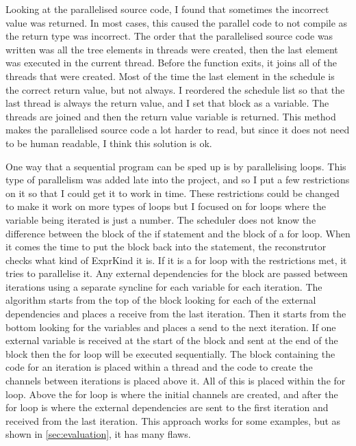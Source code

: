  Looking at the parallelised source code, I found that sometimes the incorrect value was returned. In most cases, this caused the parallel code to not compile as the return type was incorrect. The order that the parallelised source code was written was all the tree elements in threads were created, then the last element was executed in the current thread. Before the function exits, it joins all of the threads that were created. Most of the time the last element in the schedule is the correct return value, but not always. I reordered the schedule list so that the last thread is always the return value, and I set that block as a variable. The threads are joined and then the return value variable is returned. This method makes the parallelised source code a lot harder to read, but since it does not need to be human readable, I think this solution is ok.

One way that a sequential program can be sped up is by parallelising loops. This type of parallelism was added late into the project, and so I put a few restrictions on it so that I could get it to work in time. These restrictions could be changed to make it work on more types of loops but I focused on for loops where the variable being iterated is just a number. The scheduler does not know the difference between the block of the if statement and the block of a for loop. When it comes the time to put the block back into the statement, the reconstrutor checks what kind of ExprKind it is. If it is a for loop with the restrictions met, it tries to parallelise it. Any external dependencies for the block are passed between iterations using a separate syncline for each variable for each iteration. The algorithm starts from the top of the block looking for each of the external dependencies and places a receive from the last iteration. Then it starts from the bottom looking for the variables and places a send to the next iteration. If one external variable is received at the start of the block and sent at the end of the block then the for loop will be executed sequentially. The block containing the code for an iteration is placed within a thread and the code to create the channels between iterations is placed above it. All of this is placed within the for loop. Above the for loop is where the initial channels are created, and after the for loop is where the external dependencies are sent to the first iteration and received from the last iteration. This approach works for some examples, but as shown in \autoref{sec:evaluation}, it has many flaws.

\begin{comment}
\begin{code}
\begin{verbatim}
let a; // Local without init
a = {
    let b = vec![1,2,3]; // Local with init
    println!("{:?}", b); // Mac
    b.len() // Expr
}; // Semi
\end{verbatim}
\caption{Example showing different StmtKinds}
\end{code}
\end{comment}
